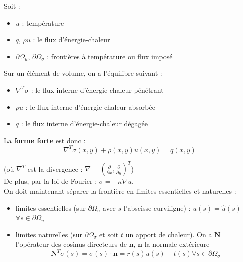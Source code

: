 \documentclass[../main.tex]{subfiles}
\begin{document}
Soit : \begin{itemize}
    \item $u$ : température\\
    \item $q$, $\rho u$ : le flux d'énergie-chaleur\\
    \item $\partial \Omega_u$, $\partial \Omega_\sigma$ : frontières à température ou flux imposé\\
\end{itemize}

Sur un élément de volume, on a l'équilibre suivant : \begin{itemize}
    \item $\nabla^T \sigma$ : le flux interne d'énergie-chaleur pénétrant\\
    \item $\rho u$ : le flux interne d'énergie-chaleur absorbée\\
    \item $q$ : le flux interne d'énergie-chaleur dégagée\\
\end{itemize}

La \textbf{forme forte }est donc : \\

\begin{equation}
    \nabla^T \sigma(x,y) + \rho(x,y) u(x,y) = q(x,y)    
\end{equation}

(où $\nabla^T$ est la divergence : $\nabla = (\frac{\partial}{\partial x}, \frac{\partial}{\partial y})^T$)\\

De plus, par la loi de Fourier : $\sigma = -\kappa \nabla u$.\\

On doit maintenant séparer la frontière en limites essentielles et naturelles : \begin{itemize}
    \item limites essentielles (sur $\partial \Omega_u$ avec $s$ l'abscisse curviligne) : $u(s) = \hat{u}(s)$ $\forall s \in \partial \Omega_u$\\
    \item limites naturelles (sur $\partial \Omega_\sigma$ et soit $t$ un apport de chaleur). On a $\mathbf{N}$ l'opérateur des cosinus directeurs de $\mathbf{n}$, $\mathbf{n}$ la normale extérieure \begin{equation}
        \mathbf{N}^T\sigma(s) = \sigma(s)\cdot \mathbf{n} = r(s)u(s)-t(s) \forall s \in \partial \Omega_\sigma
    \end{equation}
\end{itemize}
\end{document}

